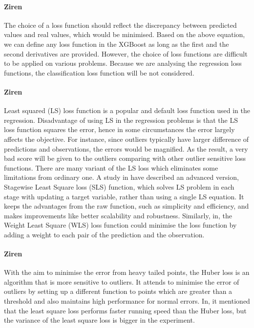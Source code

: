 \documentclass[runningheads]{llncs}
\begin{document}
\paragraph{Ziren}The choice of a loss function should reflect the discrepancy between predicted values and real values, which would be minimised. Based on the above equation, we can define any loss function in the XGBoost as long as the first and the second derivatives are provided. However, the choice of loss functions are difficult to be applied on various problems. Because we are analysing the regression loss functions, the classification loss function will be not considered.

\paragraph{Ziren} Least squared (LS) loss function is a popular and default loss function used in the regression. Disadvantage of using LS in the regression problems is that the LS loss function squares the error, hence in some circumstances the error largely affects the objective. For instance, since outliers typically have larger difference of predictions and observations, the errors would be magnified. As the result, a very bad score will be given to the outliers comparing with other outlier sensitive loss functions. There are many variant of the LS loss which eliminates some limitations from ordinary one. A study in have described an advanced version, Stagewise Least Square loss (SLS) function, which solves LS problem in each stage with updating a target variable, rather than using a single LS equation. It keeps the advantages from the raw function, such as simplicity and efficiency, and makes improvements like better scalability and robustness. Similarly, in, the Weight Least Square (WLS) loss function could minimise the loss function by adding a weight to each pair of the prediction and the observation.

\paragraph{Ziren}With the aim to minimise the error from heavy tailed points, the Huber loss is an algorithm that is more sensitive to outliers. It attends to minimise the error of outliers by setting up a different function to points which are greater than a threshold and also maintains high performance for normal errors. In, it mentioned that the least square loss performs faster running speed than the Huber loss, but the variance of the least square loss is bigger in the experiment.
\end{document}
